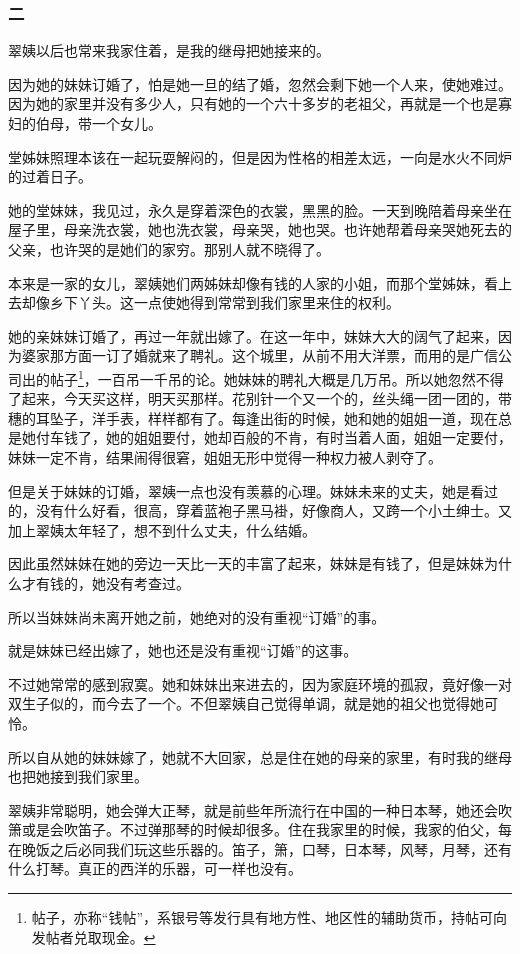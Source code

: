 \subsubsection*{二}
\par 翠姨以后也常来我家住着，是我的继母把她接来的。
\par 因为她的妹妹订婚了，怕是她一旦的结了婚，忽然会剩下她一个人来，使她难过。因为她的家里并没有多少人，只有她的一个六十多岁的老祖父，再就是一个也是寡妇的伯母，带一个女儿。
\par 堂姊妹照理本该在一起玩耍解闷的，但是因为性格的相差太远，一向是水火不同炉的过着日子。
\par 她的堂妹妹，我见过，永久是穿着深色的衣裳，黑黑的脸。一天到晚陪着母亲坐在屋子里，母亲洗衣裳，她也洗衣裳，母亲哭，她也哭。也许她帮着母亲哭她死去的父亲，也许哭的是她们的家穷。那别人就不晓得了。
\par 本来是一家的女儿，翠姨她们两姊妹却像有钱的人家的小姐，而那个堂姊妹，看上去却像乡下丫头。这一点使她得到常常到我们家里来住的权利。
\par 她的亲妹妹订婚了，再过一年就出嫁了。在这一年中，妹妹大大的阔气了起来，因为婆家那方面一订了婚就来了聘礼。这个城里，从前不用大洋票，而用的是广信公司出的帖子\footnote{帖子，亦称“钱帖”，系银号等发行具有地方性、地区性的辅助货币，持帖可向发帖者兑取现金。}，一百吊一千吊的论。她妹妹的聘礼大概是几万吊。所以她忽然不得了起来，今天买这样，明天买那样。花别针一个又一个的，丝头绳一团一团的，带穗的耳坠子，洋手表，样样都有了。每逢出街的时候，她和她的姐姐一道，现在总是她付车钱了，她的姐姐要付，她却百般的不肯，有时当着人面，姐姐一定要付，妹妹一定不肯，结果闹得很窘，姐姐无形中觉得一种权力被人剥夺了。
\par 但是关于妹妹的订婚，翠姨一点也没有羡慕的心理。妹妹未来的丈夫，她是看过的，没有什么好看，很高，穿着蓝袍子黑马褂，好像商人，又跨一个小土绅士。又加上翠姨太年轻了，想不到什么丈夫，什么结婚。
\par 因此虽然妹妹在她的旁边一天比一天的丰富了起来，妹妹是有钱了，但是妹妹为什么才有钱的，她没有考查过。
\par 所以当妹妹尚未离开她之前，她绝对的没有重视“订婚”的事。
\par 就是妹妹已经出嫁了，她也还是没有重视“订婚”的这事。
\par 不过她常常的感到寂寞。她和妹妹出来进去的，因为家庭环境的孤寂，竟好像一对双生子似的，而今去了一个。不但翠姨自己觉得单调，就是她的祖父也觉得她可怜。
\par 所以自从她的妹妹嫁了，她就不大回家，总是住在她的母亲的家里，有时我的继母也把她接到我们家里。
\par 翠姨非常聪明，她会弹大正琴，就是前些年所流行在中国的一种日本琴，她还会吹箫或是会吹笛子。不过弹那琴的时候却很多。住在我家里的时候，我家的伯父，每在晚饭之后必同我们玩这些乐器的。笛子，箫，口琴，日本琴，风琴，月琴，还有什么打琴。真正的西洋的乐器，可一样也没有。
